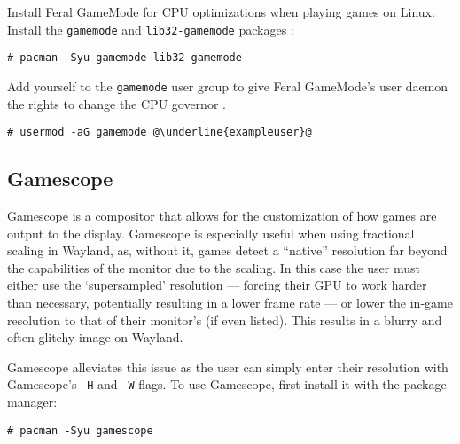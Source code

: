 \documentclass[a4paper]{article}
\begin{document}
Install Feral GameMode for CPU optimizations when playing games on Linux.
Install the \lstinline|gamemode| and \lstinline|lib32-gamemode| packages \cite{arch-wiki-gamemode}:

\begin{lstlisting}
# pacman -Syu gamemode lib32-gamemode
\end{lstlisting}

Add yourself to the \lstinline|gamemode| user group to give Feral GameMode's user daemon the rights to change the CPU governor \cite{arch-wiki-gamemode}.
\begin{lstlisting}[escapechar=@]
# usermod -aG gamemode @\underline{exampleuser}@
\end{lstlisting}

\subsection{Gamescope}

Gamescope is a compositor that allows for the customization of how games are output to the display.
Gamescope is especially useful when using fractional scaling in Wayland, as, without it, games detect a ``native'' resolution far beyond the capabilities of the monitor due to the scaling.
In this case the user must either use the `supersampled' resolution --- forcing their GPU to work harder than necessary, potentially resulting in a lower frame rate --- or lower the in-game resolution to that of their monitor's (if even listed).
This results in a blurry and often glitchy image on Wayland.

Gamescope alleviates this issue as the user can simply enter their resolution with Gamescope's \lstinline|-H| and \lstinline|-W| flags.
To use Gamescope, first install it with the package manager:
\begin{lstlisting}
# pacman -Syu gamescope
\end{lstlisting}
\end{document}
